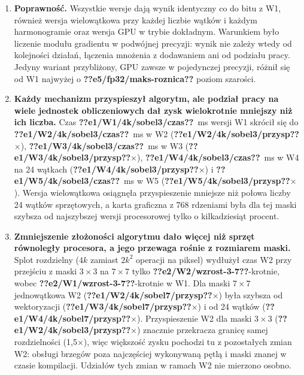 \documentclass[12pt,a4paper]{article}
\providecommand{\wynik}[1]{\textbf{??#1??}}
\begin{document}
\begin{enumerate}
	\item \textbf{Poprawność.} Wszystkie wersje dają wynik identyczny co do bitu z W1, również wersja wielowątkowa przy każdej liczbie wątków i każdym harmonogramie oraz wersja GPU w trybie dokładnym. Warunkiem było liczenie modułu gradientu w podwójnej precyzji: wynik nie zależy wtedy od kolejności działań, łączenia mnożenia z dodawaniem ani od podziału pracy. Jedyny wariant przybliżony, GPU zawsze w pojedynczej precyzji, różnił się od W1 najwyżej o \wynik{e5/fp32/maks-roznica} poziom szarości.

	\item \textbf{Każdy mechanizm przyspieszył algorytm, ale podział pracy na wiele jednostek obliczeniowych dał zysk wielokrotnie mniejszy niż ich liczba.} Czas \wynik{e1/W1/4k/sobel3/czas}~ms wersji W1 skrócił się do \wynik{e1/W2/4k/sobel3/czas}~ms w W2 (\wynik{e1/W2/4k/sobel3/przysp}$\times$), \wynik{e1/W3/4k/sobel3/czas}~ms w W3 (\wynik{e1/W3/4k/sobel3/przysp}$\times$), \wynik{e1/W4/4k/sobel3/czas}~ms w W4 na 24 wątkach (\wynik{e1/W4/4k/sobel3/przysp}$\times$) i \wynik{e1/W5/4k/sobel3/czas}~ms w W5 (\wynik{e1/W5/4k/sobel3/przysp}$\times$). Wersja wielowątkowa osiągnęła przyspieszenie mniejsze niż połowa liczby 24 wątków sprzętowych, a karta graficzna z 768 rdzeniami była dla tej maski szybsza od najszybszej wersji procesorowej tylko o kilkadziesiąt procent.

	\item \textbf{Zmniejszenie złożoności algorytmu dało więcej niż sprzęt równoległy procesora, a jego przewaga rośnie z rozmiarem maski.} Splot rozdzielny ($4k$ zamiast $2k^2$ operacji na piksel) wydłużył czas W2 przy przejściu z maski $3\times3$ na $7\times7$ tylko \wynik{e2/W2/wzrost-3-7}-krotnie, wobec \wynik{e2/W1/wzrost-3-7}-krotnie w W1. Dla maski $7\times7$ jednowątkowa W2 (\wynik{e1/W2/4k/sobel7/przysp}$\times$) była szybsza od wektoryzacji (\wynik{e1/W3/4k/sobel7/przysp}$\times$) i od 24 wątków (\wynik{e1/W4/4k/sobel7/przysp}$\times$). Przyspieszenie W2 dla maski $3\times3$ (\wynik{e1/W2/4k/sobel3/przysp}$\times$) znacznie przekracza granicę samej rozdzielności (1,5$\times$), więc większość zysku pochodzi tu z pozostałych zmian W2: obsługi brzegów poza najczęściej wykonywaną pętlą i maski znanej w czasie kompilacji. Udziałów tych zmian w ramach W2 nie mierzono osobno.


\end{enumerate}
\end{document}

